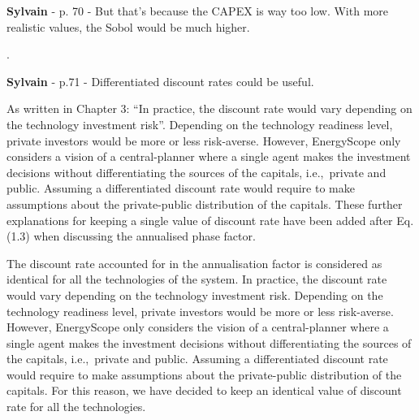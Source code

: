 \documentclass[12pt,a4paper]{article}
\def\ie{i.e.,\ }
\begin{document}
\begin{mdframed}[style=manuscript] %

\end{mdframed}

\begin{mdframed}[style=comment] %
{\color{purple} \textbf{Sylvain}} - p. 70 - But that's because the CAPEX is way too low. With more realistic values, the Sobol would be much higher.
\end{mdframed}

\noindent {\color{blue} }. 

\begin{mdframed}[style=manuscript] %

\end{mdframed}

\begin{mdframed}[style=comment] %
{\color{purple} \textbf{Sylvain}} - p.71 - Differentiated discount rates could be useful.
\end{mdframed}

\noindent As written in Chapter 3: ``In practice, the discount rate would vary depending on the technology investment risk''. Depending on the technology readiness level, private investors would be more or less risk-averse. However, EnergyScope only considers a vision of a central-planner where a single agent makes the investment decisions without differentiating the sources of the capitals, \ie private and public. Assuming a differentiated discount rate would require to make assumptions about the private-public distribution of the capitals. These further explanations for keeping a single value of discount rate have been added {\color{blue} after Eq. (1.3) when discussing the annualised phase factor}.

\begin{mdframed}[style=manuscript] %
The discount rate accounted for in the annualisation factor is considered as identical for all the technologies of the system. In practice, the discount rate would vary depending on the technology investment risk. Depending on the technology readiness level, private investors would be more or less risk-averse. However, EnergyScope only considers the vision of a central-planner where a single agent makes the investment decisions without differentiating the sources of the capitals, \ie private and public. Assuming a differentiated discount rate would require to make assumptions about the private-public distribution of the capitals. For this reason, we have decided to keep an identical value of discount rate for all the technologies.
\end{mdframed}
\end{document}
